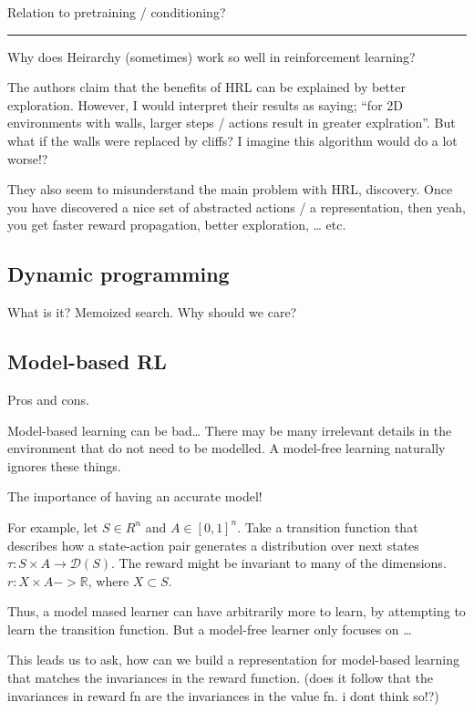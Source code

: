 Relation to pretraining / conditioning?

\begin{center}\rule{0.5\linewidth}{\linethickness}\end{center}

Why does Heirarchy (sometimes) work so well in reinforcement learning?

The authors claim that the benefits of HRL can be explained by better
exploration. However, I would interpret their results as saying; ``for
2D environments with walls, larger steps / actions result in greater
explration''. But what if the walls were replaced by cliffs? I imagine
this algorithm would do a lot worse!?

They also seem to misunderstand the main problem with HRL, discovery.
Once you have discovered a nice set of abstracted actions / a
representation, then yeah, you get faster reward propagation, better
exploration, \ldots{} etc.

\hypertarget{dynamic-programming}{%
\subsection{Dynamic programming}\label{dynamic-programming}}

What is it? Memoized search. Why should we care?

\hypertarget{model-based-rl}{%
\subsection{Model-based RL}\label{model-based-rl}}

Pros and cons.

Model-based learning can be bad\ldots{} There may be many irrelevant
details in the environment that do not need to be modelled. A model-free
learning naturally ignores these things.

The importance of having an accurate model!

For example, let \(S\in R^n\) and \(A\in [0, 1]^n\). Take a transition
function that describes how a state-action pair generates a distribution
over next states \(\tau: S \times A \to \mathcal D(S)\). The reward
might be invariant to many of the dimensions.
\(r: X \times A -> \mathbb R\), where \(X \subset S\).

Thus, a model mased learner can have arbitrarily more to learn, by
attempting to learn the transition function. But a model-free learner
only focuses on \ldots{}

This leads us to ask, how can we build a representation for model-based
learning that matches the invariances in the reward function. (does it
follow that the invariances in reward fn are the invariances in the
value fn. i dont think so!?)

